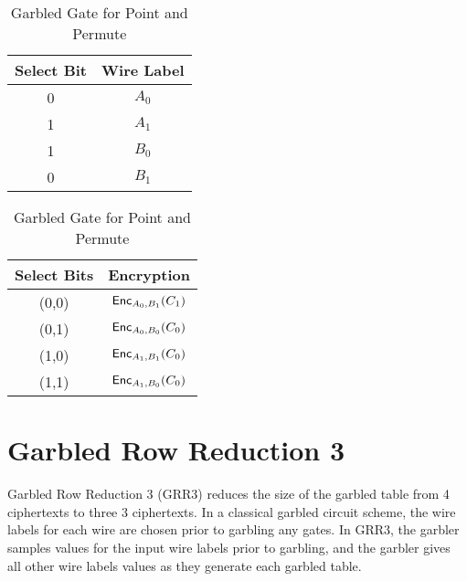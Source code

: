 \begin{table}
    \label{tbl:point-and-permute}
    \centering
    \begin{tabular}{|c|c|}
        \hline
        Select Bit & Wire Label \\
        \hline
        0 & $A_0$ \\
        1 & $A_1$ \\
        1 & $B_0$ \\
        0 & $B_1$ \\
        \hline
    \end{tabular}
    \qquad
    \begin{tabular}{|c|c|}
        \hline
        Select Bits & Encryption \\
        \hline
        (0,0) & $\textsf{Enc}_{A_0, B_1}(C_1)$ \\
        (0,1) & $\textsf{Enc}_{A_0, B_0}(C_0)$ \\
        (1,0) & $\textsf{Enc}_{A_1, B_1}(C_0)$ \\
        (1,1) & $\textsf{Enc}_{A_1, B_0}(C_0)$ \\
        \hline
    \end{tabular}
    \caption{Garbled Gate for Point and Permute}
\end{table}

\section{Garbled Row Reduction 3}
Garbled Row Reduction 3 (GRR3) reduces the size of the garbled table from 4 ciphertexts to three 3 ciphertexts.
In a classical garbled circuit scheme, the wire labels for each wire are chosen prior to garbling any gates.
In GRR3, the garbler samples values for the input wire labels prior to garbling, and the garbler gives all other wire labels values as they generate each garbled table.

